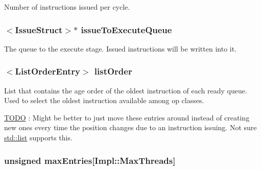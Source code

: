 \label{classInstructionQueue_a6a9ed0564894e83d4c3c5784f667c5e0}
Number of instructions issued per cycle. \hypertarget{classInstructionQueue_af5c55240e63d9a13358eede4eb5352f1}{
\subsubsection[{issueToExecuteQueue}]{$<${\bf IssueStruct}$>$$\ast$ {\bf issueToExecuteQueue}}}
\label{classInstructionQueue_af5c55240e63d9a13358eede4eb5352f1}
The queue to the execute stage. Issued instructions will be written into it. \hypertarget{classInstructionQueue_afd5860c9cc9c225411df38dd3dc89b87}{
\subsubsection[{listOrder}]{$<${\bf ListOrderEntry}$>$ {\bf listOrder}}}
\label{classInstructionQueue_afd5860c9cc9c225411df38dd3dc89b87}
List that contains the age order of the oldest instruction of each ready queue. Used to select the oldest instruction available among op classes. \begin{Desc}
\item[\hyperlink{todo__todo000031}{TODO}]: Might be better to just move these entries around instead of creating new ones every time the position changes due to an instruction issuing. Not sure \hyperlink{classstd_1_1list}{std::list} supports this. \end{Desc}
\hypertarget{classInstructionQueue_a51e5f9f0cb40d61e95b1518f1be90b73}{
\subsubsection[{maxEntries}]{\setlength{\rightskip}{0pt plus 5cm}unsigned {\bf maxEntries}\mbox{[}Impl::MaxThreads\mbox{]}}}

